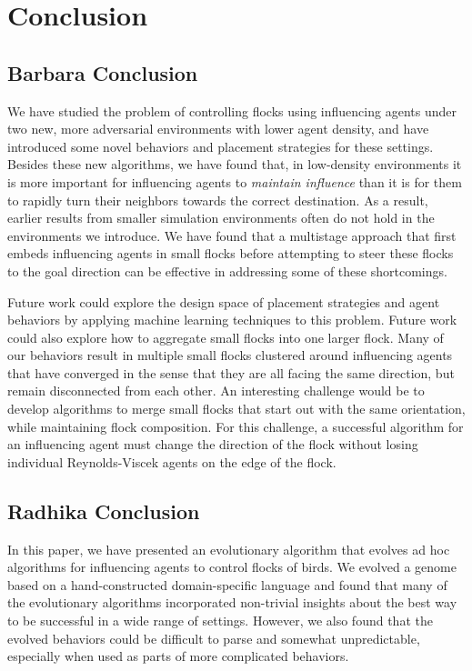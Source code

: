 \chapter{Conclusion}
\label{conclusion}

\section{Barbara Conclusion}
We have studied the problem of controlling flocks using influencing agents
under two new, more adversarial environments with lower agent density, and
have introduced some novel behaviors and placement strategies for these settings.
Besides these new algorithms, we have found that, in low-density
environments it is more important for influencing agents to
\textit{maintain influence} than it is for them to rapidly turn their
neighbors towards the correct destination.
As a result, earlier results from smaller simulation environments often do
not hold in the environments we introduce.
We have found that a multistage approach that first embeds influencing
agents in small flocks before attempting to steer these flocks to the goal
direction can be effective in addressing some of these shortcomings.

Future work could explore the design space of placement strategies and agent
behaviors by applying machine learning techniques to this problem.
Future work could also explore how to aggregate small flocks into one larger
flock.
Many of our behaviors result in multiple small flocks clustered around
influencing agents that have converged in the sense that they are all facing the
same direction, but remain disconnected from each other.
An interesting challenge would be to develop algorithms to merge small flocks that
start out with the same orientation, while maintaining flock composition.
For this challenge, a successful algorithm for an influencing agent must change
the direction of the flock without losing individual Reynolds-Viscek agents on
the edge of the flock.

\section{Radhika Conclusion}
In this paper, we have presented an evolutionary algorithm that evolves
ad hoc algorithms for influencing agents to control flocks of birds.
We evolved a genome based on a hand-constructed domain-specific language
and found that many of the evolutionary algorithms incorporated non-trivial
insights about the best way to be successful in a wide range of settings.
However, we also found that the evolved behaviors could be difficult to 
parse and somewhat unpredictable, especially when used as parts of more
complicated behaviors.


